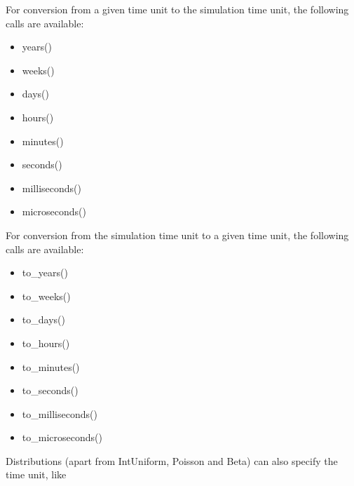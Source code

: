 \documentclass[letterpaper,10pt,english]{sphinxmanual}
\begin{document}
For conversion from a given time unit to the simulation time unit, the following calls are available:
\begin{itemize}
\item {} 
years()

\item {} 
weeks()

\item {} 
days()

\item {} 
hours()

\item {} 
minutes()

\item {} 
seconds()

\item {} 
milliseconds()

\item {} 
microseconds()

\end{itemize}

For conversion from the simulation time unit to a given time unit, the following calls are available:
\begin{itemize}
\item {} 
to\_years()

\item {} 
to\_weeks()

\item {} 
to\_days()

\item {} 
to\_hours()

\item {} 
to\_minutes()

\item {} 
to\_seconds()

\item {} 
to\_milliseconds()

\item {} 
to\_microseconds()

\end{itemize}

Distributions (apart from IntUniform, Poisson and Beta) can also specify the time unit, like

\begin{sphinxVerbatim}[commandchars=\\\{\}]
  
    
    
\end{sphinxVerbatim}
\end{document}
